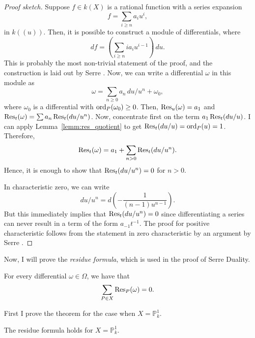 \begin{proof}[Proof sketch]
  Suppose $f\in k(X)$ is a rational function with a series expansion
  \[
    f=\sum_{i\geq n}a_{i}u^{i},
  \]
  in $k((u))$. Then, it is possible to construct a module of differentials, where
  \[
    df=\left(\sum_{i\geq n}ia_{i}u^{i-1}\right)\,du.
  \]
  This is probably the most non-trivial statement of the proof, and the
  construction is laid out by Serre \cite{serre}. Now, we can write a
  differential $\omega$ in this module as
  \[
    \omega = \sum_{n\geq 0}a_{n}\,du/u^{n}+\omega_{0},
  \]
  where $\omega_{0}$ is a differential with $\operatorname{ord}_{P}(\omega_{0})\geq 0$.
  Then, $\operatorname{Res}_{u}(\omega)=a_{1}$ and $\operatorname{Res}_{t}(\omega)=
  \sum a_{n}\operatorname{Res}_{t}(du/u^{n})$. Now, concentrate first on the term
  $a_{1}\operatorname{Res}_{t}(du/u)$. I can apply Lemma~\ref{lemm:res_quotient}
  to get $\operatorname{Res}_{t}(du/u)=\operatorname{ord}_{P}(u)=1$. Therefore,
  \[
    \operatorname{Res}_{t}(\omega) = a_{1}+\sum_{n>0}\operatorname{Res}_{t}(du/u^{n}).
  \]
  Hence, it is enough to show that $\operatorname{Res}_{t}(du/u^{n})=0$ for $n>0$.

  In characteristic zero, we can write
  \[
    du/u^{n}=d\left(-\frac1{(n-1)u^{n-1}}\right).
  \]
  But this immediately implies that $\operatorname{Res}_{t}(du/u^{n})=0$ since
  differentiating a series can never result in a term of the form
  $a_{-1}t^{-1}$. The proof for positive characteristic follows from the
  statement in zero characteristic by an argument by Serre \cite{serre}.
\end{proof}
Now, I will prove the \emph{residue formula}, which is used in the proof
of Serre Duality.
\begin{thm}\label{thm:residue_theorem}
  For every differential $\omega\in\Omega$, we have that
  \[
    \sum_{P\in X}\operatorname{Res}_{P}(\omega)=0.
  \]
\end{thm}
First I prove the theorem for the case when $X=\mathbb{P}^{1}_{k}$.
\begin{lemm}
  The residue formula holds for $X=\mathbb{P}^{1}_{k}$.
\end{lemm}
